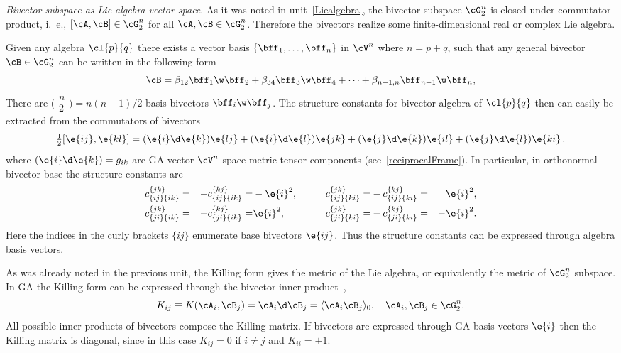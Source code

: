 %
\begin{unit}\textit{Bivector subspace as Lie algebra vector space}.
As it was noted in unit~\ref{Liealgebra}, the bivector subspace
$\cG_2^n$ is  closed under commutator product, i.~e.,
$[\cA,\cB]\in\cG_2^n$ for all $\cA,\cB\in\cG_2^n$. Therefore the
bivectors realize some finite-dimensional real or complex Lie
algebra.  

Given any algebra $\cl{p}{q}$ there exists a vector 
basis $\{\bff_1,\dots,\bff_n\}$ in $\cV^n$ where $n=p+q$, such that
any general bivector $\cB\in\cG_2^n$ can be written in the following form 
\[
\cB=\beta_{12}\bff_1\w\bff_2+\beta_{34}\bff_3\w\bff_4+\dots+\beta_{n-1,n}\bff_{n-1}\w\bff_{n},
\]
There are $\bigl(\begin{smallmatrix}n\\2\end{smallmatrix}\bigr)=n(n-1)/2$ basis bivectors $\bff_i\w\bff_j$. %
The structure constants for bivector algebra of $\cl{p}{q}$ 
then can easily be extracted from the commutators of bivectors
\[
\tfrac{1}{2}[\e{ij},\e{kl}]=(\e{i}\d\e{k})\e{lj}+(\e{i}\d\e{l})\e{jk}+
(\e{j}\d\e{k})\e{il}+(\e{j}\d\e{l})\e{ki}\,.
\]
where $(\e{i}\d\e{k})=g_{ik}$ are GA vector 
$\cV^n$ space metric tensor components (see~\ref{reciprocalFrame}). In particular, in 
orthonormal bivector base the structure constants are
\begin{alignat*}{4}
&c_{\{ij\}\{ik\}}^{\{jk\}}=&-c_{\{ij\}\{ik\}}^{\{kj\}}=&-\e{i}^2,&\qquad
    c_{\{ij\}\{ki\}}^{\{jk\}}=&-c_{\{ij\}\{ki\}}^{\{kj\}}=&\e{i}^2,\\
&c_{\{ji\}\{ik\}}^{\{jk\}}=&-c_{\{ji\}\{ik\}}^{\{kj\}}=&\e{i}^2,&
    c_{\{ji\}\{ki\}}^{\{jk\}}=&-c_{\{ji\}\{ki\}}^{\{kj\}}=&-\e{i}^2.
   \end{alignat*}
Here the indices in the curly brackets $\{ij\}$ enumerate base
bivectors $\e{ij}$. Thus the structure constants can be expressed
through  algebra basis vectors.

As was already noted in the previous unit, the Killing form gives
the metric of the Lie algebra, or equivalently the metric of
$\cG_2^n$ subspace. In GA the Killing form  can be
expressed through the bivector inner product~\cite{Lundholm09},%
\[K_{ij}\equiv K(\cA_i,\cB_j)=\cA_i\d\cB_j=\langle\cA_i\cB_j\rangle_0,\quad\cA_i,\cB_j\in\cG_2^n. \]
All possible inner products of bivectors compose the Killing matrix.
If bivectors are expressed through GA basis vectors $\e{i}$ then
the Killing matrix is diagonal, since in this case $K_{ij}=0$ if
$i\ne j$ and $K_{ii}=\pm 1$.

\end{unit}
